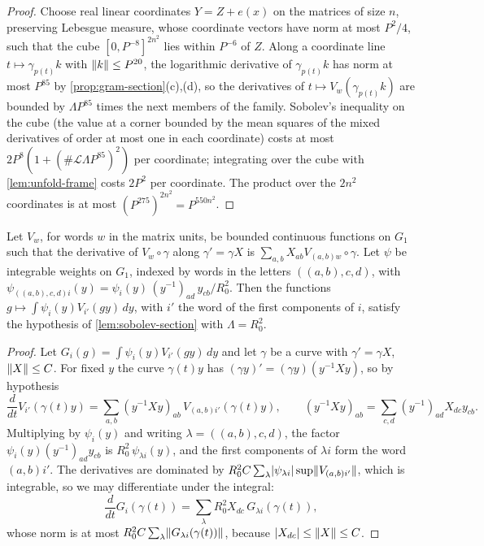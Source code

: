 \begin{proof}
Choose real linear coordinates $Y=Z+e(x)$ on the matrices of size $n$, preserving Lebesgue measure, whose coordinate vectors have norm at most $P^2/4$, such that the cube $[0,P^{-8}]^{2n^2}$ lies within $P^{-6}$ of $Z$. Along a
coordinate line $t\mapsto\gamma_{p(t)}k$ with $\lVert k\rVert\le P^{20}$, the logarithmic derivative of $\gamma_{p(t)}k$ has norm at most $P^{85}$ by \cref{prop:gram-section}(c),(d), so the derivatives of $t\mapsto V_w(\gamma_{p(t)}k)$ are bounded by
$\Lambda P^{85}$ times the next members of the family. Sobolev's inequality on the cube (the value at a corner bounded by the mean squares of the mixed derivatives of order at most one in each coordinate) costs at most
$2P^8(1+(\#\mathcal L\Lambda P^{85})^2)$ per coordinate; integrating over the cube with \cref{lem:unfold-frame} costs $2P^2$ per coordinate. The product over the $2n^2$ coordinates is at most $(P^{275})^{2n^2}=P^{550n^2}$.
\end{proof}

\begin{lemma}\label{lem:convolution-derivatives}
Let $V_w$, for words $w$ in the matrix units, be bounded continuous functions on $G_1$ such that the derivative of $V_w\circ\gamma$ along $\gamma'=\gamma X$ is $\sum_{a,b}X_{ab}V_{(a,b)w}\circ\gamma$. Let $\psi$ be integrable weights on $G_1$, indexed by words in
the letters $((a,b),c,d)$, with $\psi_{((a,b),c,d)i}(y)=\psi_i(y)\,(y^{-1})_{ad}\,y_{cb}/R_0^2$. Then the functions $g\mapsto\int\psi_i(y)V_{i'}(gy)\,dy$, with $i'$ the word of the first components of $i$, satisfy the hypothesis of
\cref{lem:sobolev-section} with $\Lambda=R_0^2$.
\end{lemma}

\begin{proof}
Let $G_i(g)=\int\psi_i(y)V_{i'}(gy)\,dy$ and let $\gamma$ be a curve with $\gamma'=\gamma X$, $\lVert X\rVert\le C$. For fixed $y$ the curve $\gamma(t)y$ has $(\gamma y)'=(\gamma y)(y^{-1}Xy)$, so by hypothesis
\[
  \frac d{dt}V_{i'}(\gamma(t)y)=\sum_{a,b}(y^{-1}Xy)_{ab}\,V_{(a,b)i'}(\gamma(t)y),\qquad (y^{-1}Xy)_{ab}=\sum_{c,d}(y^{-1})_{ad}X_{dc}y_{cb}.
\]
Multiplying by $\psi_i(y)$ and writing $\lambda=((a,b),c,d)$, the factor $\psi_i(y)(y^{-1})_{ad}y_{cb}$ is $R_0^2\,\psi_{\lambda i}(y)$, and the first components of $\lambda i$ form the word $(a,b)i'$. The derivatives are dominated by
$R_0^2C\sum_\lambda\lvert \psi_{\lambda i}\rvert\sup\lVert V_{(a,b)i'}\rVert$, which is integrable, so we may differentiate under the integral:
\[
  \frac d{dt}G_i(\gamma(t))=\sum_\lambda R_0^2X_{dc}\,G_{\lambda i}(\gamma(t)),
\]
whose norm is at most $R_0^2C\sum_\lambda\lVert G_{\lambda i}(\gamma(t))\rVert$, because $\lvert X_{dc}\rvert\le\lVert X\rVert\le C$.
\end{proof}

